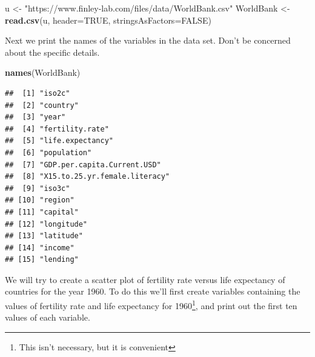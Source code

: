 \documentclass[
]{krantz}
\newenvironment{Shaded}{\begin{snugshade}}{\end{snugshade}}
\newcommand{\DataTypeTok}[1]{\textcolor[rgb]{0.13,0.29,0.53}{#1}}
\newcommand{\DecValTok}[1]{\textcolor[rgb]{0.00,0.00,0.81}{#1}}
\newcommand{\KeywordTok}[1]{\textcolor[rgb]{0.13,0.29,0.53}{\textbf{#1}}}
\newcommand{\NormalTok}[1]{#1}
\newcommand{\OperatorTok}[1]{\textcolor[rgb]{0.81,0.36,0.00}{\textbf{#1}}}
\newcommand{\OtherTok}[1]{\textcolor[rgb]{0.56,0.35,0.01}{#1}}
\newcommand{\StringTok}[1]{\textcolor[rgb]{0.31,0.60,0.02}{#1}}
\begin{document}
\begin{Shaded}
\begin{Highlighting}[]
\NormalTok{u \textless{}{-}}\StringTok{ "https://www.finley{-}lab.com/files/data/WorldBank.csv"}
\NormalTok{WorldBank \textless{}{-}}\StringTok{ }\KeywordTok{read.csv}\NormalTok{(u, }\DataTypeTok{header=}\OtherTok{TRUE}\NormalTok{, }\DataTypeTok{stringsAsFactors=}\OtherTok{FALSE}\NormalTok{)}
\end{Highlighting}
\end{Shaded}

Next we print the names of the variables in the data set. Don't be concerned about the specific details.

\begin{Shaded}
\begin{Highlighting}[]
\KeywordTok{names}\NormalTok{(WorldBank)}
\end{Highlighting}
\end{Shaded}

\begin{verbatim}
##  [1] "iso2c"                       
##  [2] "country"                     
##  [3] "year"                        
##  [4] "fertility.rate"              
##  [5] "life.expectancy"             
##  [6] "population"                  
##  [7] "GDP.per.capita.Current.USD"  
##  [8] "X15.to.25.yr.female.literacy"
##  [9] "iso3c"                       
## [10] "region"                      
## [11] "capital"                     
## [12] "longitude"                   
## [13] "latitude"                    
## [14] "income"                      
## [15] "lending"
\end{verbatim}

We will try to create a scatter plot of fertility rate versus life expectancy of countries for the year 1960. To do this we'll first create variables containing the values of fertility rate and life expectancy for 1960\footnote{This isn't necessary, but it is convenient}, and print out the first ten values of each variable.

\begin{Shaded}
\end{Shaded}
\end{document}
